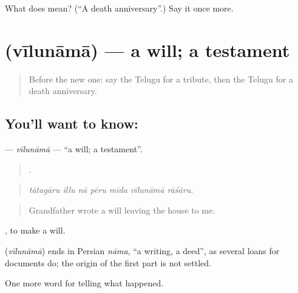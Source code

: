 \begin{tcolorbox}[breakable,colback=teal!4,colframe=teal!35!black,title={Before you move on}]
What does  mean? (\textquotedblleft{}A death anniversary\textquotedblright{}.) Say it once more.
\end{tcolorbox}
\section[\texorpdfstring{\te{వీలునామా} (vīlunāmā)}{వీలునామా (vīlunāmā)}]{ (vīlunāmā) — a will; a testament}

\label{lesson:TE-C345-vilunama}



\begin{quote}
Before the new one: say the Telugu for a tribute, then the Telugu for a death anniversary.
\end{quote}

\subsection*{You'll want to know: }
\textbf{} — \emph{vīlunāmā} — \textquotedblleft{}a will; a testament\textquotedblright{}.

\begin{quote}
      .
\end{quote}

\begin{quote}
\emph{tātagāru illu nā pēru mīda vīlunāmā rāśāru.}
\end{quote}

\begin{quote}
Grandfather wrote a will leaving the house to me.
\end{quote}

 , to make a will.

\begin{cousinweb}
\textbf{} (\emph{vīlunāmā}) ends in Persian \emph{nāma}, \textquotedblleft{}a writing, a deed\textquotedblright{}, as several loans for documents do; the origin of the first part is not settled.
\end{cousinweb}

\begin{grammarlens}[title={What you've built}]
One more word for telling what happened.
\end{grammarlens}

